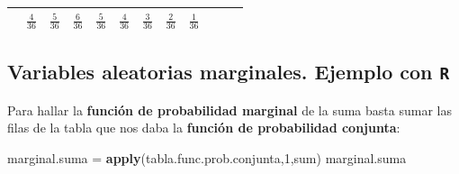 \documentclass[]{book}
\newenvironment{Shaded}{\begin{snugshade}}{\end{snugshade}}
\newcommand{\DecValTok}[1]{\textcolor[rgb]{0.00,0.00,0.81}{#1}}
\newcommand{\KeywordTok}[1]{\textcolor[rgb]{0.13,0.29,0.53}{\textbf{#1}}}
\newcommand{\NormalTok}[1]{#1}
\newcommand{\StringTok}[1]{\textcolor[rgb]{0.31,0.60,0.02}{#1}}
\begin{document}
\begin{longtable}[]{@{}llllllllllll@{}}
\begin{minipage}[t]{0.06\columnwidth}
\end{minipage} & \begin{minipage}[t]{0.06\columnwidth}\raggedright
\(\frac{4}{36}\)\strut
\end{minipage} & \begin{minipage}[t]{0.06\columnwidth}\raggedright
\(\frac{5}{36}\)\strut
\end{minipage} & \begin{minipage}[t]{0.06\columnwidth}\raggedright
\(\frac{6}{36}\)\strut
\end{minipage} & \begin{minipage}[t]{0.06\columnwidth}\raggedright
\(\frac{5}{36}\)\strut
\end{minipage} & \begin{minipage}[t]{0.06\columnwidth}\raggedright
\(\frac{4}{36}\)\strut
\end{minipage} & \begin{minipage}[t]{0.06\columnwidth}\raggedright
\(\frac{3}{36}\)\strut
\end{minipage} & \begin{minipage}[t]{0.06\columnwidth}\raggedright
\(\frac{2}{36}\)\strut
\end{minipage} & \begin{minipage}[t]{0.06\columnwidth}\raggedright
\(\frac{1}{36}\)\strut
\end{minipage}\tabularnewline
\bottomrule
\end{longtable}

\hypertarget{variables-aleatorias-marginales.-ejemplo-con-r}{%
\subsection{\texorpdfstring{Variables aleatorias marginales. Ejemplo con \texttt{R}}{Variables aleatorias marginales. Ejemplo con R}}\label{variables-aleatorias-marginales.-ejemplo-con-r}}

Para hallar la \textbf{función de probabilidad marginal} de la suma basta sumar las filas de la tabla que nos daba la \textbf{función de probabilidad conjunta}:

\begin{Shaded}
\begin{Highlighting}[]
\NormalTok{marginal.suma =}\StringTok{ }\KeywordTok{apply}\NormalTok{(tabla.func.prob.conjunta,}\DecValTok{1}\NormalTok{,sum)}
\NormalTok{marginal.suma}
\end{Highlighting}
\end{Shaded}
\end{document}
